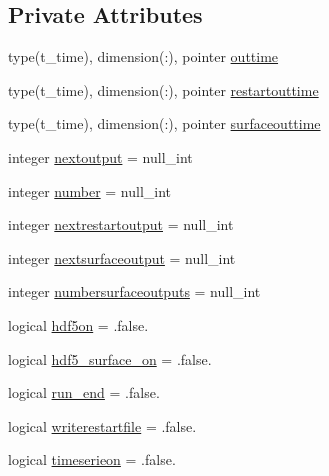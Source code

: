 \subsection*{Private Attributes}
\begin{DoxyCompactItemize}
\item 
type(t\+\_\+time), dimension(\+:), pointer \mbox{\hyperlink{structmodulehydrodynamic_1_1t__output_a6e376f7d6c461819319b097505696817}{outtime}}
\item 
type(t\+\_\+time), dimension(\+:), pointer \mbox{\hyperlink{structmodulehydrodynamic_1_1t__output_ab6c8ce8b8d135c31a0c1dee1ef515f84}{restartouttime}}
\item 
type(t\+\_\+time), dimension(\+:), pointer \mbox{\hyperlink{structmodulehydrodynamic_1_1t__output_a46c6fd1ee1e4b9e73b9941fa02b782cd}{surfaceouttime}}
\item 
integer \mbox{\hyperlink{structmodulehydrodynamic_1_1t__output_a87fb4c204c497b3fcf7aa8c14907a850}{nextoutput}} = null\+\_\+int
\item 
integer \mbox{\hyperlink{structmodulehydrodynamic_1_1t__output_aa365b86c18699dd5f96edc8f94d3e477}{number}} = null\+\_\+int
\item 
integer \mbox{\hyperlink{structmodulehydrodynamic_1_1t__output_a2129848323bafdb80c13e8b78f3f0ec9}{nextrestartoutput}} = null\+\_\+int
\item 
integer \mbox{\hyperlink{structmodulehydrodynamic_1_1t__output_a8a8f56fc6bfbd6b2a4d63fb967544e9a}{nextsurfaceoutput}} = null\+\_\+int
\item 
integer \mbox{\hyperlink{structmodulehydrodynamic_1_1t__output_a93d322506669b8a8fa8c1859031f354e}{numbersurfaceoutputs}} = null\+\_\+int
\item 
logical \mbox{\hyperlink{structmodulehydrodynamic_1_1t__output_aad9c9e0769d8e03ae97416167fd71ead}{hdf5on}} = .false.
\item 
logical \mbox{\hyperlink{structmodulehydrodynamic_1_1t__output_a0fdf26bb6f33931fc13ca3b4bab68483}{hdf5\+\_\+surface\+\_\+on}} = .false.
\item 
logical \mbox{\hyperlink{structmodulehydrodynamic_1_1t__output_a68eef7bf6c3c5a8bf7f8452d2146a0a3}{run\+\_\+end}} = .false.
\item 
logical \mbox{\hyperlink{structmodulehydrodynamic_1_1t__output_af09f5f35209931d753ed3dcad5572c57}{writerestartfile}} = .false.
\item 
logical \mbox{\hyperlink{structmodulehydrodynamic_1_1t__output_a34794a2437d675886292b78d8d92d4d2}{timeserieon}} = .false.
\item 

\end{DoxyCompactItemize}
